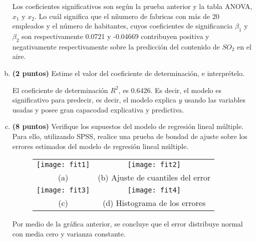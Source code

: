\documentclass[../main.tex]{subfiles}
\begin{document}
\begin{enumerate}[(a)]
Los coeficientes significativos son según la prueba anterior y la tabla ANOVA, $x_1$ y $x_2$. Lo cuál significa que el nñumero de fabricas con más de 20 empleados y el número de habitantes, cuyos coeficientes de significancia $\beta_1$ y $\beta_2$ son respectivamente 0.0721 y -0.04669 contribuyen positiva y negativamente respectivamente sobre la predicción del contenido de $SO_2$ en el aire.

\item \textbf{(2 puntos)} Estime el valor del coeficiente de determinación, e interprételo.

El coeficiente de determinación $R^2$, es 0.6426. Es decir, el modelo es significativo para predecir, es decir, el modelo explica $y$ usando las variables usadas y posee gran capacodad explicativa y predictiva.


\item \textbf{(8 puntos)} Verifique los supuestos del modelo de regresión lineal múltiple. Para ello, utilizando SPSS, realice una prueba de bondad de ajuste sobre los errores estimados del
modelo de regresión lineal múltiple.

\begin{figure}[h]
\begin{tabular}{cc}
  \texttt{[image: fit1]} &   \texttt{[image: fit2]} \\
(a)  & (b) Ajuste de cuantiles del error \\[6pt]
 \texttt{[image: fit3]} &   \texttt{[image: fit4]} \\
(c)  & (d) Histograma de los errores
\end{tabular}
\caption{}
\end{figure}

Por medio de la gráfica anterior, se concluye que el error distribuye normal con media cero y varianza constante.

\end{enumerate}
\end{document}
